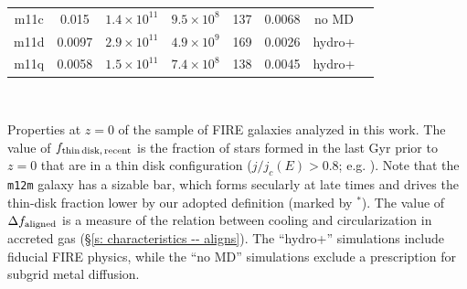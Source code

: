 \documentclass[fleqn,usenatbib]{mnras}
\begin{document}
\begin{table}
\begin{tabular}{cccccccc}
m11c  &  0.015  &  $1.4\times10^{11}$  &  $9.5\times10^{8}$  &  137  &  0.0068  &  no MD  &  \cite{Hopkins2018}    \\
m11d  &  0.0097  &  $2.9\times10^{11}$  &  $4.9\times10^{9}$  &  169  &  0.0026  &  hydro+  &  \cite{El-Badry2018a}    \\
m11q  &  0.0058  &  $1.5\times10^{11}$  &  $7.4\times10^{8}$  &  138  &  0.0045  &  hydro+  &  \cite{Hopkins2018}    \\ %
\end{tabular}
\\
\begin{flushleft}
Properties at $z=0$ of the sample of FIRE galaxies analyzed in this work.
The value of $f_{\rm thin\,disk,\,recent}$ is the fraction of stars formed in the last Gyr prior to $z=0$ that are in a thin disk configuration ($j/j_c(E) > 0.8$; e.g. \citealt{Yu2021}).
Note that the \texttt{m12m} galaxy has a sizable bar, which forms secularly at late times and drives the thin-disk fraction lower by our adopted definition (marked by $^*$).
The value of $\Delta f_{\rm aligned}$ is a measure of the relation between cooling and circularization in accreted gas (\S\ref{s: characteristics -- aligns}).
The ``hydro+'' simulations include fiducial FIRE physics, while the ``no MD'' simulations exclude a prescription for subgrid metal diffusion.
\end{flushleft}
\label{table: simulations_used}
\end{table}

\end{document}
